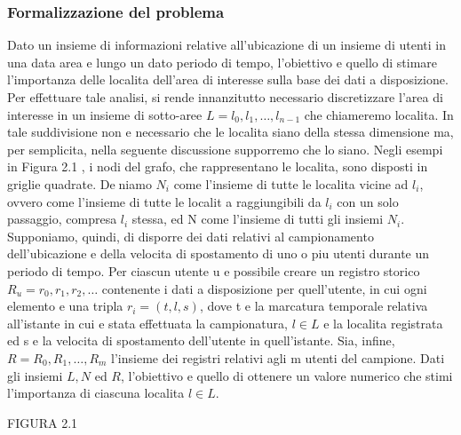 \subsubsection{Formalizzazione del problema}
Dato un insieme di informazioni relative all'ubicazione di un insieme di utenti
in una data area e lungo un dato periodo di tempo, l'obiettivo e quello
di stimare l'importanza delle localita dell'area di interesse sulla base dei dati
a disposizione. Per effettuare tale analisi, si rende innanzitutto necessario
discretizzare l'area di interesse in un insieme di sotto-aree $L = l_{0},l_{1},\dots,l_{n-1}$
che chiameremo localita. In tale suddivisione non e necessario che le localita
siano della stessa dimensione ma, per semplicita, nella seguente discussione
supporremo che lo siano. Negli esempi in Figura 2.1 , i nodi del grafo, che rappresentano
le localita, sono disposti in griglie quadrate. Deniamo $N_{i}$ come
l'insieme di tutte le localita vicine ad $l_{i}$, ovvero come l'insieme di tutte le localit
a raggiungibili da $l_{i}$ con un solo passaggio, compresa $l_{i}$ stessa, ed N come
l'insieme di tutti gli insiemi $N_{i}$. Supponiamo, quindi, di disporre dei dati relativi
al campionamento dell'ubicazione e della velocita di spostamento di uno
o piu utenti durante un periodo di tempo. Per ciascun utente u e possibile
creare un registro storico $R_{u} = r_{0},r_{1},r_{2},\dots$ contenente i dati a disposizione
per quell'utente, in cui ogni elemento e una tripla $r_{i} = (t,l,s)$, dove t e la marcatura
temporale relativa all'istante in cui e stata effettuata la campionatura,
$l \in L$ e la localita registrata ed s e la velocita di spostamento dell'utente in
quell'istante. Sia, infine, $R = R_{0},R_{1},\dots,R_{m}$ l'insieme dei registri relativi agli m
utenti del campione. Dati gli insiemi $L, N$ ed $R$, l'obiettivo e quello di ottenere
un valore numerico che stimi l'importanza di ciascuna localita $l \in L$.

FIGURA  2.1

